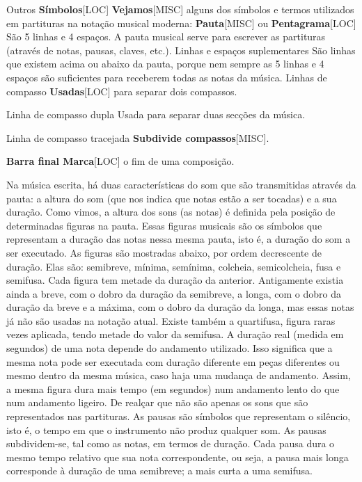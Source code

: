 \documentclass[a4paper,12pt]{article}
\begin{document}
Outros \textbf{Símbolos}\textsc{[LOC]} \textbf{Vejamos}\textsc{[MISC]} alguns dos símbolos e termos utilizados em partituras na notação musical moderna: \textbf{Pauta}\textsc{[MISC]} ou \textbf{Pentagrama}\textsc{[LOC]} São 5 linhas e 4 espaços. A pauta musical serve para escrever as partituras (através de notas, pausas, claves, etc.). Linhas e espaços suplementares São linhas que existem acima ou abaixo da pauta, porque nem sempre as 5 linhas e 4 espaços são suficientes para receberem todas as notas da música. Linhas de compasso \textbf{Usadas}\textsc{[LOC]} para separar dois compassos.

Linha de compasso dupla Usada para separar duas secções da música.

Linha de compasso tracejada \textbf{Subdivide compassos}\textsc{[MISC]}.

\textbf{Barra final Marca}\textsc{[LOC]} o fim de uma composição.

Na música escrita, há duas características do som que são transmitidas através da pauta: a altura do som (que nos indica que notas estão a ser tocadas) e a sua duração. Como vimos, a altura dos sons (as notas) é definida pela posição de determinadas figuras na pauta. Essas figuras musicais são os símbolos que representam a duração das notas nessa mesma pauta, isto é, a duração do som a ser executado. As figuras são mostradas abaixo, por ordem decrescente de duração. Elas são: semibreve, mínima, semínima, colcheia, semicolcheia, fusa e semifusa. Cada figura tem metade da duração da anterior. Antigamente existia ainda a breve, com o dobro da duração da semibreve, a longa, com o dobro da duração da breve e a máxima, com o dobro da duração da longa, mas essas notas já não são usadas na notação atual. Existe também a quartifusa, figura raras vezes aplicada, tendo metade do valor da semifusa. A duração real (medida em segundos) de uma nota depende do andamento utilizado. Isso significa que a mesma nota pode ser executada com duração diferente em peças diferentes ou mesmo dentro da mesma música, caso haja uma mudança de andamento. Assim, a mesma figura dura mais tempo (em segundos) num andamento lento do que num andamento ligeiro. De realçar que não são apenas os sons que são representados nas partituras. As pausas são símbolos que representam o silêncio, isto é, o tempo em que o instrumento não produz qualquer som. As pausas subdividem-se, tal como as notas, em termos de duração. Cada pausa dura o mesmo tempo relativo que sua nota correspondente, ou seja, a pausa mais longa corresponde à duração de uma semibreve; a mais curta a uma semifusa.
\end{document}
